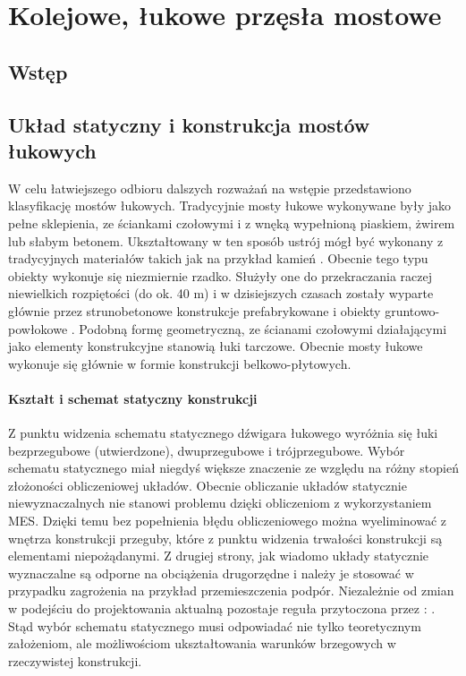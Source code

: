 \chapter{Kolejowe, łukowe przęsła mostowe}
\section{Wstęp}


\section{Układ statyczny i konstrukcja mostów łukowych}

W celu łatwiejszego odbioru dalszych rozważań na wstępie przedstawiono klasyfikację mostów łukowych. Tradycyjnie mosty łukowe wykonywane były jako pełne sklepienia, ze ściankami czołowymi i z wnęką wypełnioną piaskiem, żwirem lub słabym betonem. Ukształtowany w ten sposób ustrój mógł być wykonany z tradycyjnych materiałów takich jak na przykład kamień \parencite{Szczygie1978}. Obecnie tego typu obiekty wykonuje się niezmiernie rzadko. Służyły one do przekraczania raczej niewielkich rozpiętości (do ok. 40 m) i w dzisiejszych czasach zostały wyparte głównie przez strunobetonowe konstrukcje prefabrykowane \parencite{Ciesla2013} i obiekty gruntowo-powłokowe \parencite{Janusz2009,Tomala2019}. Podobną formę geometryczną, ze ścianami czołowymi działającymi jako elementy konstrukcyjne stanowią łuki tarczowe. Obecnie mosty łukowe wykonuje się głównie w formie konstrukcji belkowo-płytowych. 


\subsubsection{Kształt i schemat statyczny konstrukcji}
Z punktu widzenia schematu statycznego dźwigara łukowego wyróżnia się łuki bezprzegubowe (utwierdzone), dwuprzegubowe i trójprzegubowe. Wybór schematu statycznego miał niegdyś większe znaczenie ze względu na różny stopień złożoności obliczeniowej układów. Obecnie obliczanie układów statycznie niewyznaczalnych nie stanowi problemu dzięki obliczeniom z wykorzystaniem MES. Dzięki temu bez popełnienia błędu obliczeniowego można wyeliminować z wnętrza konstrukcji przeguby, które z punktu widzenia trwałości konstrukcji są elementami niepożądanymi. Z drugiej strony, jak wiadomo układy statycznie wyznaczalne są odporne na obciążenia drugorzędne i należy je stosować w przypadku zagrożenia na przykład przemieszczenia podpór. Niezależnie od zmian w podejściu do projektowania aktualną pozostaje reguła przytoczona przez \cite{Pszenicki1954}: . Stąd wybór schematu statycznego musi odpowiadać nie tylko teoretycznym założeniom, ale możliwościom ukształtowania warunków brzegowych w rzeczywistej konstrukcji. 

